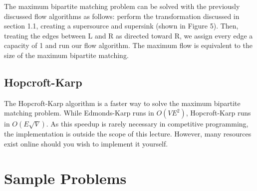 \documentclass[11pt, oneside]{article}
\begin{document}
The maximum bipartite matching problem can be solved with the previously discussed flow algorithms as follows: perform the transformation discussed in section 1.1, creating a supersource and supersink (shown in Figure 5). Then, treating the edges between L and R as directed toward R, we assign every edge a capacity of 1 and run our flow algorithm. The maximum flow is equivalent to the size of the maximum bipartite matching.

\subsection{Hopcroft-Karp}

The Hopcroft-Karp algorithm is a faster way to solve the maximum bipartite matching problem. While Edmonds-Karp runs in \( O(VE^2)\), Hopcroft-Karp runs in \( O(E\sqrt{V})\). As this speedup is rarely necessary in competitive programming, the implementation is outside the scope of this lecture. However, many resources exist online should you wish to implement it yourself.

\newpage
\section{Sample Problems}
\end{document}
